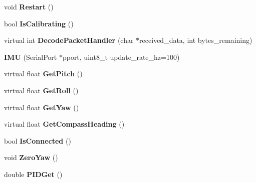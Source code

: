 \begin{DoxyCompactItemize}
\item 
\hypertarget{class_i_m_u_acc57c44ede00d36ece51325dcd2f9b1e}{}void {\bfseries Restart} ()\label{class_i_m_u_acc57c44ede00d36ece51325dcd2f9b1e}

\item 
\hypertarget{class_i_m_u_a487c9c4355277cebe1a3b4bcc05b58d1}{}bool {\bfseries Is\+Calibrating} ()\label{class_i_m_u_a487c9c4355277cebe1a3b4bcc05b58d1}

\item 
\hypertarget{class_i_m_u_ab7cc1a50aa8aafa63662a87086ef5282}{}virtual int {\bfseries Decode\+Packet\+Handler} (char $\ast$received\+\_\+data, int bytes\+\_\+remaining)\label{class_i_m_u_ab7cc1a50aa8aafa63662a87086ef5282}

\item 
\hypertarget{class_i_m_u_ae843cd598703cc3a38e8839aa3371c81}{}{\bfseries I\+M\+U} (Serial\+Port $\ast$pport, uint8\+\_\+t update\+\_\+rate\+\_\+hz=100)\label{class_i_m_u_ae843cd598703cc3a38e8839aa3371c81}

\item 
\hypertarget{class_i_m_u_a041e0b4fc5a6463c2339f46fe705315f}{}virtual float {\bfseries Get\+Pitch} ()\label{class_i_m_u_a041e0b4fc5a6463c2339f46fe705315f}

\item 
\hypertarget{class_i_m_u_a0b25452e33b5e01e129d4383678dc9d7}{}virtual float {\bfseries Get\+Roll} ()\label{class_i_m_u_a0b25452e33b5e01e129d4383678dc9d7}

\item 
\hypertarget{class_i_m_u_a7bff603b5f082a5c4e423855e1001edf}{}virtual float {\bfseries Get\+Yaw} ()\label{class_i_m_u_a7bff603b5f082a5c4e423855e1001edf}

\item 
\hypertarget{class_i_m_u_aae9f37f38a500198982440a0bda0f5e7}{}virtual float {\bfseries Get\+Compass\+Heading} ()\label{class_i_m_u_aae9f37f38a500198982440a0bda0f5e7}

\item 
\hypertarget{class_i_m_u_a9d0d770cb38985e5c3ab35d1cd09b3e2}{}bool {\bfseries Is\+Connected} ()\label{class_i_m_u_a9d0d770cb38985e5c3ab35d1cd09b3e2}

\item 
\hypertarget{class_i_m_u_acb3fa9e821ed200dd7f39cd4ae94b7c1}{}void {\bfseries Zero\+Yaw} ()\label{class_i_m_u_acb3fa9e821ed200dd7f39cd4ae94b7c1}

\item 
\hypertarget{class_i_m_u_a8484485e99ecdd6647059c307344f82d}{}double {\bfseries P\+I\+D\+Get} ()\label{class_i_m_u_a8484485e99ecdd6647059c307344f82d}


\end{DoxyCompactItemize}
